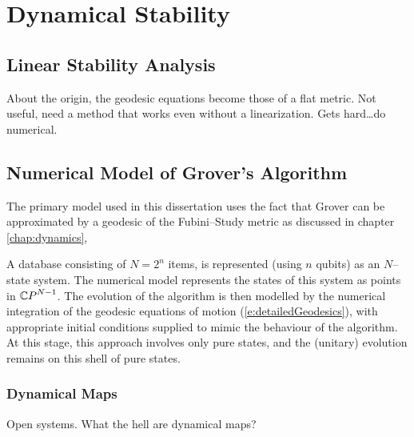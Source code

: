 
\chapter{Dynamical Stability}
\label{chap:dynamicalStability}
%



\section{Linear Stability Analysis}

About the origin, the geodesic equations become those of a flat metric.
Not useful, need a method that works even without a linearization.
Gets hard\dots do numerical.


\section{Numerical Model of Grover's Algorithm}

The primary model used in this dissertation uses the fact
that Grover can be approximated by a geodesic of the
Fubini--Study metric as discussed in chapter \ref{chap:dynamics},

A database consisting of $N=2^n$ items, is represented (using
$n$ qubits) as an $N$--state system.
The numerical model represents the states of this system as points 
in ${\mathbb{C} P}^{N-1}$.  The evolution of the algorithm is then modelled by the
numerical integration of the geodesic equations of motion
(\ref{e:detailedGeodesics}), with 
appropriate initial conditions supplied to mimic the behaviour of 
the algorithm.  At this stage, this approach involves only pure 
states, and the (unitary) evolution remains on this shell of pure 
states.


\subsection{Dynamical Maps}
Open systems.
What the hell are dynamical maps?

